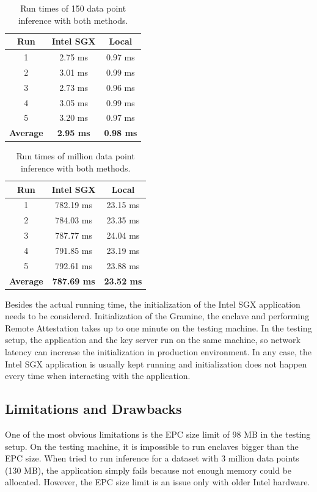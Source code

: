 \begin{table}
\centering{}\caption{Run times of 150 data point inference with both methods.\label{tab:performance}}
\begin{tabular}{|c|c|c|}
Run & Intel SGX & Local \tabularnewline
\hline 
1 & 2.75 ms & 0.97 ms \tabularnewline
2 & 3.01 ms & 0.99 ms \tabularnewline
3 & 2.73 ms & 0.96 ms \tabularnewline
4 & 3.05 ms & 0.99 ms \tabularnewline
5 & 3.20 ms & 0.97 ms \tabularnewline
\hline 
\textbf{Average} & \textbf{2.95 ms} & \textbf{0.98 ms} \tabularnewline
\end{tabular}
\end{table}

\begin{table}
\centering{}\caption{Run times of million data point inference with both methods.\label{tab:performance2}}
\begin{tabular}{|c|c|c|}
Run & Intel SGX & Local \tabularnewline
\hline 
1 & 782.19 ms & 23.15 ms \tabularnewline
2 & 784.03 ms & 23.35 ms \tabularnewline
3 & 787.77 ms & 24.04 ms \tabularnewline
4 & 791.85 ms & 23.19 ms \tabularnewline
5 & 792.61 ms & 23.88 ms \tabularnewline
\hline 
\textbf{Average} & \textbf{787.69 ms} & \textbf{23.52 ms} \tabularnewline
\end{tabular}
\end{table}

Besides the actual running time, the initialization of the Intel SGX application needs to be considered. Initialization of the Gramine, the enclave and performing Remote Attestation takes up to one minute on the testing machine. In the testing setup, the application and the key server run on the same machine, so network latency can increase the initialization in production environment. In any case, the Intel SGX application is usually kept running and initialization does not happen every time when interacting with the application.

\subsection{Limitations and Drawbacks} \label{perceivedlimitations}

One of the most obvious limitations is the EPC size limit of 98 MB in the testing setup. On the testing machine, it is impossible to run enclaves bigger than the EPC size. When tried to run inference for a dataset with 3 million data points (130 MB), the application simply fails because not enough memory could be allocated. However, the EPC size limit is an issue only with older Intel hardware.


